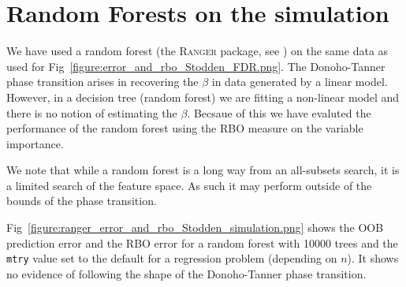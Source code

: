 \documentclass[11pt]{article}
\newcommand{\cursedforest}{\textsc{CursedForest}\xspace}
\newcommand{\ranger}{\textsc{Ranger}\xspace}
\newcommand{\mtry}{\texttt{mtry}\xspace}
\begin{document}
\section{Random Forests on the simulation}

We have used a random forest (the \ranger package, see \cite{Wright.and.Ziegle.2016})
on the same data as used for Fig~\ref{figure:error_and_rbo_Stodden_FDR.png}. The
Donoho-Tanner phase transition arises in recovering the $\beta$ in data generated by a linear model. However, in a
decision tree (random forest) we are fitting a non-linear model and there is no notion of estimating the
$\beta$. Becsaue of this we have evaluted the performance of the random forest using the RBO measure
on the variable importance.

We note that while a random forest is a long way from an all-subsets search, it is a limited search of the feature
space. As such it may perform outside of the bounds of the phase transition. 

Fig~\ref{figure:ranger_error_and_rbo_Stodden_simulation.png} shows the OOB prediction error and the RBO error for a
random forest with 10000 trees and the \mtry value set to the default for a regression problem (depending on $n$). It
shows no evidence of following the shape of the Donoho-Tanner phase transition.
\end{document}

